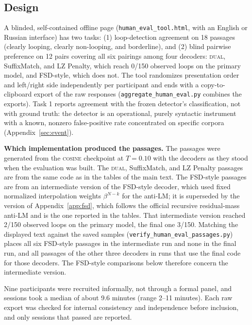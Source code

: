 \documentclass[make,article,submit,pdftex]{Definitions/mdpi}
\begin{document}
\subsection{Design}
A blinded, self-contained offline page (\texttt{human\_\allowbreak{}eval\_\allowbreak{}tool.html}, with an English or Russian interface) has two tasks: (1) loop-detection agreement on 18 passages (clearly looping, clearly non-looping, and borderline), and (2) blind pairwise preference on 12 pairs covering all six pairings among four decoders: \textsc{dual}, SuffixMatch, and LZ Penalty, which reach 0/150 observed loops on the primary model, and FSD-style, which does not. The tool randomizes presentation order and left/right side independently per participant and ends with a copy-to-clipboard export of the raw responses (\texttt{aggregate\_\allowbreak{}human\_\allowbreak{}eval.py} combines the exports). Task 1 reports agreement with the frozen detector's classification, not with ground truth: the detector is an operational, purely syntactic instrument with a known, nonzero false-positive rate concentrated on specific corpora (Appendix~\ref{sec:event}).

\textbf{Which implementation produced the passages.} The passages were generated from the \textsc{cosine} checkpoint at $T{=}0.10$ with the decoders as they stood when the evaluation was built. The \textsc{dual}, SuffixMatch, and LZ Penalty passages are from the same code as in the tables of the main text. The FSD-style passages are from an intermediate version of the FSD-style decoder, which used fixed normalized interpolation weights $\beta^{N-k}$ for the anti-LM; it is superseded by the version of Appendix~\ref{app:fsd}, which follows the official recursive residual-mass anti-LM and is the one reported in the tables. That intermediate version reached 2/150 observed loops on the primary model, the final one 3/150. Matching the displayed text against the saved samples (\texttt{verify\_\allowbreak{}human\_\allowbreak{}eval\_\allowbreak{}passages.py}) places all six FSD-style passages in the intermediate run and none in the final run, and all passages of the other three decoders in runs that use the final code for those decoders. The FSD-style comparisons below therefore concern the intermediate version.

Nine participants were recruited informally, not through a formal panel, and sessions took a median of about 9.6 minutes (range 2--11 minutes). Each raw export was checked for internal consistency and independence before inclusion, and only sessions that passed are reported.
\end{document}
